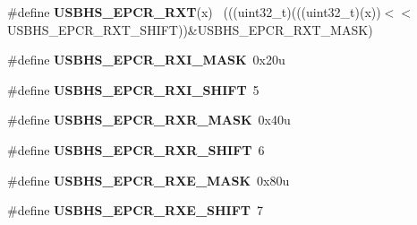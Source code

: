\begin{DoxyCompactItemize}
\item 
\hypertarget{group___u_s_b_h_s___register___masks_gaedd1a5c48bf5b9f33b286d09827bff96}{}\#define {\bfseries U\+S\+B\+H\+S\+\_\+\+E\+P\+C\+R\+\_\+\+R\+X\+T}(x)                                            ~(((uint32\+\_\+t)(((uint32\+\_\+t)(x))$<$$<$U\+S\+B\+H\+S\+\_\+\+E\+P\+C\+R\+\_\+\+R\+X\+T\+\_\+\+S\+H\+I\+F\+T))\&U\+S\+B\+H\+S\+\_\+\+E\+P\+C\+R\+\_\+\+R\+X\+T\+\_\+\+M\+A\+S\+K)\label{group___u_s_b_h_s___register___masks_gaedd1a5c48bf5b9f33b286d09827bff96}

\item 
\hypertarget{group___u_s_b_h_s___register___masks_ga13ebe424636261622065836af57023e9}{}\#define {\bfseries U\+S\+B\+H\+S\+\_\+\+E\+P\+C\+R\+\_\+\+R\+X\+I\+\_\+\+M\+A\+S\+K}~0x20u\label{group___u_s_b_h_s___register___masks_ga13ebe424636261622065836af57023e9}

\item 
\hypertarget{group___u_s_b_h_s___register___masks_ga5de26b2202a37d1e49dd617d2766adc7}{}\#define {\bfseries U\+S\+B\+H\+S\+\_\+\+E\+P\+C\+R\+\_\+\+R\+X\+I\+\_\+\+S\+H\+I\+F\+T}~5\label{group___u_s_b_h_s___register___masks_ga5de26b2202a37d1e49dd617d2766adc7}

\item 
\hypertarget{group___u_s_b_h_s___register___masks_gaa0b6786cc721076c72904eeb1ecc17dd}{}\#define {\bfseries U\+S\+B\+H\+S\+\_\+\+E\+P\+C\+R\+\_\+\+R\+X\+R\+\_\+\+M\+A\+S\+K}~0x40u\label{group___u_s_b_h_s___register___masks_gaa0b6786cc721076c72904eeb1ecc17dd}

\item 
\hypertarget{group___u_s_b_h_s___register___masks_ga9c770c9e47643629d4412cc964fa59b6}{}\#define {\bfseries U\+S\+B\+H\+S\+\_\+\+E\+P\+C\+R\+\_\+\+R\+X\+R\+\_\+\+S\+H\+I\+F\+T}~6\label{group___u_s_b_h_s___register___masks_ga9c770c9e47643629d4412cc964fa59b6}

\item 
\hypertarget{group___u_s_b_h_s___register___masks_ga7373a289ae2bb592ac901a9141dbbd1c}{}\#define {\bfseries U\+S\+B\+H\+S\+\_\+\+E\+P\+C\+R\+\_\+\+R\+X\+E\+\_\+\+M\+A\+S\+K}~0x80u\label{group___u_s_b_h_s___register___masks_ga7373a289ae2bb592ac901a9141dbbd1c}

\item 
\hypertarget{group___u_s_b_h_s___register___masks_gab81da728431f7f85d3d24c664c6d1ad0}{}\#define {\bfseries U\+S\+B\+H\+S\+\_\+\+E\+P\+C\+R\+\_\+\+R\+X\+E\+\_\+\+S\+H\+I\+F\+T}~7\label{group___u_s_b_h_s___register___masks_gab81da728431f7f85d3d24c664c6d1ad0}


\end{DoxyCompactItemize}
